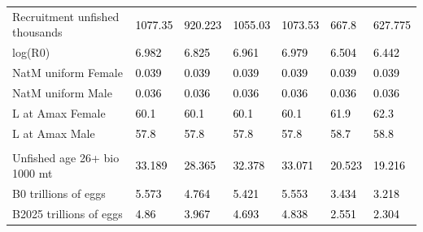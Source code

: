 \documentclass[
  english,
]{article}
\begin{document}
\begin{landscape}
\begin{longtable}[t]{ll>{\raggedright\arraybackslash}p{5em}>{\raggedright\arraybackslash}p{5em}>{\raggedright\arraybackslash}p{5em}>{\raggedright\arraybackslash}p{5em}>{\raggedright\arraybackslash}p{5em}}
\hspace{1em}Recruitment unfished thousands & \textcolor{black}{1077.35} & \textcolor{black}{920.223} & \textcolor{black}{1055.03} & \textcolor{black}{1073.53} & \textcolor{black}{667.8} & \textcolor{black}{627.775}\\
\hspace{1em}log(R0) & \textcolor{black}{6.982} & \textcolor{black}{6.825} & \textcolor{black}{6.961} & \textcolor{black}{6.979} & \textcolor{black}{6.504} & \textcolor{black}{6.442}\\
\hspace{1em}NatM uniform Female & \textcolor{black}{0.039} & \textcolor{black}{0.039} & \textcolor{black}{0.039} & \textcolor{black}{0.039} & \textcolor{black}{0.039} & \textcolor{black}{0.039}\\
\hspace{1em}NatM uniform Male & \textcolor{black}{0.036} & \textcolor{black}{0.036} & \textcolor{black}{0.036} & \textcolor{black}{0.036} & \textcolor{black}{0.036} & \textcolor{black}{0.036}\\
\hspace{1em}L at Amax Female & \textcolor{black}{60.1} & \textcolor{black}{60.1} & \textcolor{black}{60.1} & \textcolor{black}{60.1} & \textcolor{black}{61.9} & \textcolor{black}{62.3}\\
\hspace{1em}L at Amax Male & \textcolor{black}{57.8} & \textcolor{black}{57.8} & \textcolor{black}{57.8} & \textcolor{black}{57.8} & \textcolor{black}{58.7} & \textcolor{black}{58.8}\\
\addlinespace[0.3em]
\multicolumn{7}{l}{\textbf{Estimates of derived quantities}}\\
\hspace{1em}Unfished age 26+ bio 1000 mt & \textcolor{black}{33.189} & \textcolor{black}{28.365} & \textcolor{black}{32.378} & \textcolor{black}{33.071} & \textcolor{black}{20.523} & \textcolor{black}{19.216}\\
\hspace{1em}B0 trillions of eggs & \textcolor{black}{5.573} & \textcolor{black}{4.764} & \textcolor{black}{5.421} & \textcolor{black}{5.553} & \textcolor{black}{3.434} & \textcolor{black}{3.218}\\
\hspace{1em}B2025 trillions of eggs & \textcolor{black}{4.86} & \textcolor{black}{3.967} & \textcolor{black}{4.693} & \textcolor{black}{4.838} & \textcolor{black}{2.551} & \textcolor{black}{2.304}\\

\end{longtable}
\end{landscape}
\end{document}
